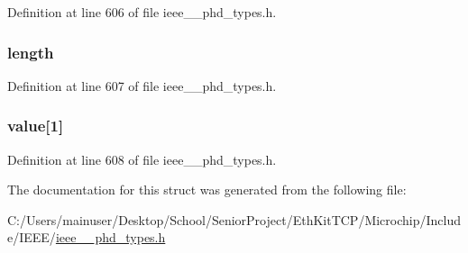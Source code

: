 Definition at line 606 of file ieee\+\_\+\_\+phd\+\_\+types.\+h.

\hypertarget{struct___modification_list_a3743679e4ff85e3e1b3fc2e59973fbb3}{}
\subsubsection[{length}]{ length}\label{struct___modification_list_a3743679e4ff85e3e1b3fc2e59973fbb3}


Definition at line 607 of file ieee\+\_\+\_\+phd\+\_\+types.\+h.

\hypertarget{struct___modification_list_ac9a276cfbe21a876363c5aaca6cf323f}{}
\subsubsection[{value}]{ value\mbox{[}1\mbox{]}}\label{struct___modification_list_ac9a276cfbe21a876363c5aaca6cf323f}


Definition at line 608 of file ieee\+\_\+\_\+phd\+\_\+types.\+h.



The documentation for this struct was generated from the following file\+:\begin{DoxyCompactItemize}
\item 
C\+:/\+Users/mainuser/\+Desktop/\+School/\+Senior\+Project/\+Eth\+Kit\+T\+C\+P/\+Microchip/\+Include/\+I\+E\+E\+E/\hyperlink{ieee__11073__phd__types_8h}{ieee\+\_\+\_\+phd\+\_\+types.\+h}\end{DoxyCompactItemize}
